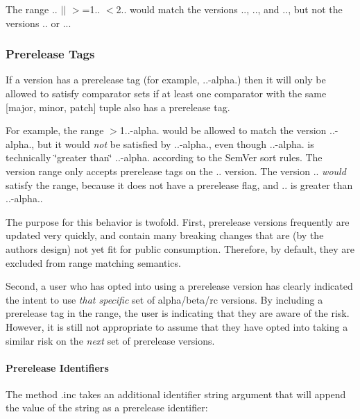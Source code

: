The range {.. $\vert$$\vert$ $>$=1.. $<$2..} would match the versions {..}, {..}, and {..}, but not the versions {..} or {..}.

\subsubsection*{Prerelease Tags}

If a version has a prerelease tag (for example, {..-\/alpha.}) then it will only be allowed to satisfy comparator sets if at least one comparator with the same {\ttfamily \mbox{[}major, minor, patch\mbox{]}} tuple also has a prerelease tag.

For example, the range {\ttfamily $>$1..-\/alpha.} would be allowed to match the version {..-\/alpha.}, but it would {\itshape not} be satisfied by {..-\/alpha.}, even though {..-\/alpha.} is technically \char`\"{}greater
than\char`\"{} {..-\/alpha.} according to the Sem\+Ver sort rules. The version range only accepts prerelease tags on the {..} version. The version {..} {\itshape would} satisfy the range, because it does not have a prerelease flag, and {..} is greater than {..-\/alpha.}.

The purpose for this behavior is twofold. First, prerelease versions frequently are updated very quickly, and contain many breaking changes that are (by the author\textquotesingle{}s design) not yet fit for public consumption. Therefore, by default, they are excluded from range matching semantics.

Second, a user who has opted into using a prerelease version has clearly indicated the intent to use {\itshape that specific} set of alpha/beta/rc versions. By including a prerelease tag in the range, the user is indicating that they are aware of the risk. However, it is still not appropriate to assume that they have opted into taking a similar risk on the {\itshape next} set of prerelease versions.

\paragraph*{Prerelease Identifiers}

The method {\ttfamily .inc} takes an additional {\ttfamily identifier} string argument that will append the value of the string as a prerelease identifier\+:


